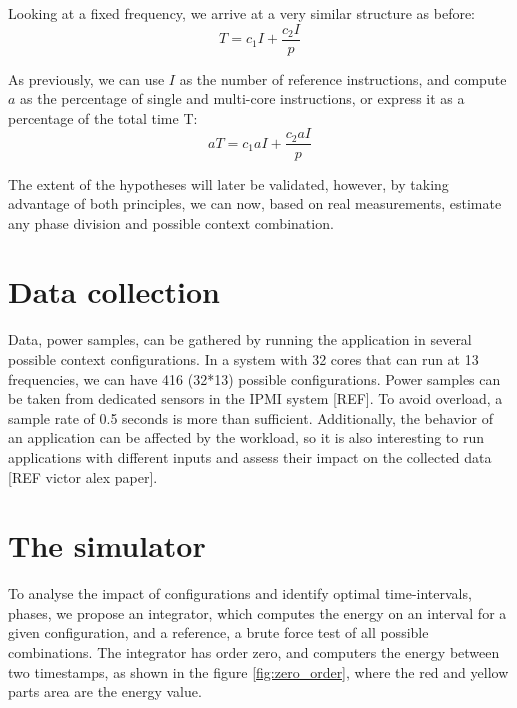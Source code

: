 Looking at a fixed frequency, we arrive at a very similar structure as before:
\begin{equation}
T=c_1I+\frac{c_2I}{p}
\end{equation}


As previously, we can use $I$ as the number of reference instructions, and compute $a$ as the percentage of single and multi-core instructions, or express it as a percentage of the total time T:
\begin{equation}
aT=c_1aI+\frac{c_2aI}{p}
\end{equation}


The extent of the hypotheses will later be validated, however, by taking advantage of both principles, we can now, based on real measurements, estimate any phase division and possible context combination.




\section{Data collection} \label{sec:data_collection}
Data, power samples, can be gathered by running the application in several possible context configurations. In a system with 32 cores that can run at 13 frequencies, we can have 416 (32*13) possible configurations. Power samples can be taken from dedicated sensors in the IPMI system [REF]. To avoid overload, a sample rate of 0.5 seconds is more than sufficient. Additionally, the behavior of an application can be affected by the workload, so it is also interesting to run applications with different inputs and assess their impact on the collected data [REF victor alex paper].


\section{The simulator} \label{sec:the_simulator}
To analyse the impact of configurations and identify optimal time-intervals, phases, we propose an integrator, which computes the energy on an interval for a given configuration, and a reference, a brute force test of all possible combinations. The integrator has order zero, and computers the energy between two timestamps, as shown in the figure \ref{fig:zero_order}, where the red and yellow parts area are the energy value.


